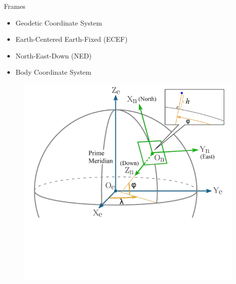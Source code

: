 
\begin{frame}{Frames}{}

  \begin{itemize}
  \item Geodetic Coordinate System
  \item Earth-Centered Earth-Fixed (ECEF)
  \item North-East-Down (NED)
  \item Body Coordinate System
  
  \end{itemize}

 

  
\begin{figure}[H]
\centerline{
\includegraphics[scale=0.35]{figures/GeoTemp1.png}}
\label{fig:frames}
\end{figure}  
  
  
\end{frame}

